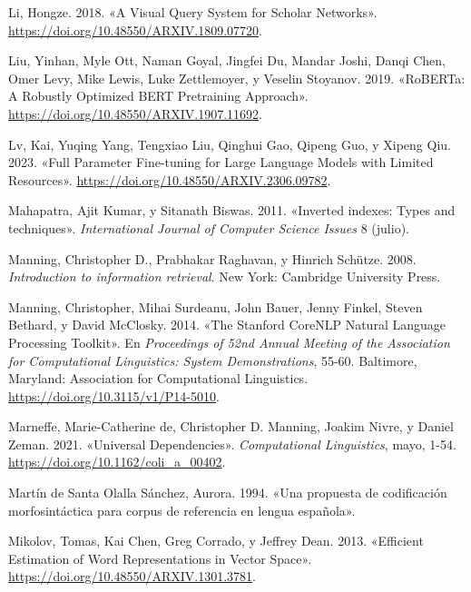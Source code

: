\documentclass[
  12pt,
  openany]{book}
\newlength{\cslhangindent}
\newlength{\cslentryspacingunit} %
\newenvironment{CSLReferences}[2] %
 {%
  \setlength{\parindent}{0pt}
  \ifodd #1
  \let\oldpar\par
  \def\par{\hangindent=\cslhangindent\oldpar}
  \fi
  \setlength{\parskip}{#2\cslentryspacingunit}
 }%
 {}
\begin{document}
\begin{CSLReferences}{1}{0}
\leavevmode{}%
Li, Hongze. 2018. {«A Visual Query System for Scholar Networks»}. \url{https://doi.org/10.48550/ARXIV.1809.07720}.

\leavevmode{}%
Liu, Yinhan, Myle Ott, Naman Goyal, Jingfei Du, Mandar Joshi, Danqi Chen, Omer Levy, Mike Lewis, Luke Zettlemoyer, y Veselin Stoyanov. 2019. {«RoBERTa: A Robustly Optimized BERT Pretraining Approach»}. \url{https://doi.org/10.48550/ARXIV.1907.11692}.

\leavevmode{}%
Lv, Kai, Yuqing Yang, Tengxiao Liu, Qinghui Gao, Qipeng Guo, y Xipeng Qiu. 2023. {«Full Parameter Fine-tuning for Large Language Models with Limited Resources»}. \url{https://doi.org/10.48550/ARXIV.2306.09782}.

\leavevmode{}%
Mahapatra, Ajit Kumar, y Sitanath Biswas. 2011. {«Inverted indexes: Types and techniques»}. \emph{International Journal of Computer Science Issues} 8 (julio).

\leavevmode{}%
Manning, Christopher D., Prabhakar Raghavan, y Hinrich Schütze. 2008. \emph{Introduction to information retrieval}. New York: Cambridge University Press.

\leavevmode{}%
Manning, Christopher, Mihai Surdeanu, John Bauer, Jenny Finkel, Steven Bethard, y David McClosky. 2014. {«The {S}tanford {C}ore{NLP} Natural Language Processing Toolkit»}. En \emph{Proceedings of 52nd Annual Meeting of the Association for Computational Linguistics: System Demonstrations}, 55-60. Baltimore, Maryland: Association for Computational Linguistics. \url{https://doi.org/10.3115/v1/P14-5010}.

\leavevmode{}%
Marneffe, Marie-Catherine de, Christopher D. Manning, Joakim Nivre, y Daniel Zeman. 2021. {«Universal Dependencies»}. \emph{Computational Linguistics}, mayo, 1-54. \url{https://doi.org/10.1162/coli_a_00402}.

\leavevmode{}%
Martín de Santa Olalla Sánchez, Aurora. 1994. {«Una propuesta de codificación morfosintáctica para corpus de referencia en lengua española»}.

\leavevmode{}%
Mikolov, Tomas, Kai Chen, Greg Corrado, y Jeffrey Dean. 2013. {«Efficient Estimation of Word Representations in Vector Space»}. \url{https://doi.org/10.48550/ARXIV.1301.3781}.


\end{CSLReferences}
\end{document}
